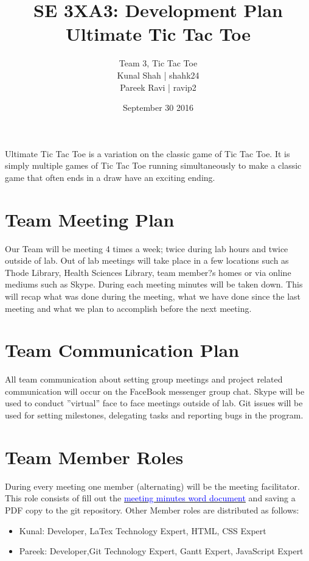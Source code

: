 \documentclass{article}
\title{SE 3XA3: Development Plan\\Ultimate Tic Tac Toe}
\author{Team 3, Tic Tac Toe
		\\ Kunal Shah | shahk24
		\\ Pareek Ravi | ravip2
}
\date{September 30 2016}
\begin{document}
\maketitle

\tableofcontents
\newpage

Ultimate Tic Tac Toe is a variation on the classic game of Tic Tac Toe. It is 
simply multiple games of Tic Tac Toe running simultaneously to make a classic 
game that often ends in a draw have an exciting ending.

\section{Team Meeting Plan}
Our Team will be meeting 4 times a week; twice during lab hours and twice 
outside of lab. Out of lab meetings will take place in a few locations such as
Thode Library, Health Sciences Library, team member?s homes or via online 
 mediums such as Skype. During each meeting minutes will be taken down. 
 This will recap what was done during the meeting, what we have done since the 
last meeting and what we plan to accomplish before the next meeting.

\section{Team Communication Plan}
All team communication about setting group
meetings and project related communication will occur on the FaceBook messenger
group chat. Skype will be used to conduct ''virtual'' face to face meetings
outside of lab. Git issues will be used for setting milestones, delegating tasks
and reporting bugs in the program.

\section{Team Member Roles}
During every meeting one member (alternating) will
be the meeting facilitator. This role consists of fill out the \href{run:3XA3
Meeting Summary Template.docx}{\textcolor{blue}{meeting minutes word document}}
and saving a PDF copy to the git repository. Other Member roles are distributed
as follows:
\begin{itemize}
  \item Kunal: Developer, LaTex Technology Expert, HTML, CSS Expert 
  \item Pareek: Developer,Git Technology Expert, Gantt Expert, JavaScript Expert 

\end{itemize}
\end{document}

